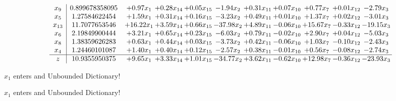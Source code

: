 \documentclass[9pt]{article}
\begin{document}
 \[\begin{array}{c| c c@{\hskip 2pt} c@{\hskip 2pt} c@{\hskip 2pt} c@{\hskip 2pt} c@{\hskip 2pt} c@{\hskip 2pt} c@{\hskip 2pt} c@{\hskip 2pt} c@{\hskip 2pt} }
 x_{9}   &  0.899678358095 & +  0.97 x_{1} & +  0.28 x_{14} & +  0.05 x_{15} & -1.94 x_{2} & +  0.31 x_{11} & +  0.07 x_{10} & +  0.77 x_{7} & +  0.01 x_{12} & -2.79 x_{3}\\
 x_{5}   &  1.27584622454 & +  1.59 x_{1} & +  0.31 x_{14} & +  0.16 x_{15} & -3.23 x_{2} & +  0.49 x_{11} & +  0.01 x_{10} & +  1.37 x_{7} & +  0.02 x_{12} & -3.01 x_{3}\\
 x_{13}   &  11.7077653546 & + 16.22 x_{1} & +  3.59 x_{14} & +  0.66 x_{15} & -37.98 x_{2} & +  4.89 x_{11} & -0.06 x_{10} & + 15.67 x_{7} & -0.33 x_{12} & -19.15 x_{3}\\
 x_{6}   &  2.19849900444 & +  3.21 x_{1} & +  0.65 x_{14} & +  0.23 x_{15} & -6.03 x_{2} & +  0.79 x_{11} & -0.02 x_{10} & +  2.90 x_{7} & +  0.04 x_{12} & -5.03 x_{3}\\
 x_{8}   &  1.38359626283 & +  0.63 x_{1} & +  0.44 x_{14} & +  0.03 x_{15} & -3.73 x_{2} & +  0.42 x_{11} & -0.06 x_{10} & +  1.03 x_{7} & -0.10 x_{12} & -2.43 x_{3}\\
 x_{4}   &  1.24460101087 & +  1.40 x_{1} & +  0.40 x_{14} & +  0.12 x_{15} & -2.57 x_{2} & +  0.38 x_{11} & -0.01 x_{10} & +  0.56 x_{7} & -0.08 x_{12} & -2.74 x_{3}\\
\hline
z    &  10.9355950375 & +  9.65 x_{1} & +  3.33 x_{14} & +  1.01 x_{15} & -34.77 x_{2} & +  3.62 x_{11} & -0.62 x_{10} & + 12.98 x_{7} & -0.36 x_{12} & -23.93 x_{3}\\
\end{array}\]


 $ x_{1} $ enters and Unbounded Dictionary!


 $ x_{1} $ enters and Unbounded Dictionary!
\end{document}
